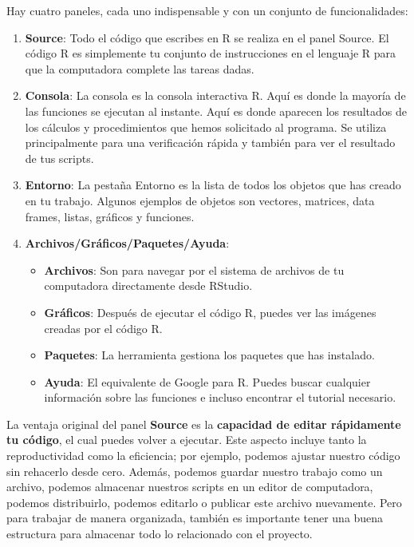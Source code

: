 \documentclass[
  letterpaper,
  DIV=11,
  numbers=noendperiod,
  twoside]{scrreprt}
\providecommand{\tightlist}{%
  \setlength{\itemsep}{0pt}\setlength{\parskip}{0pt}}\usepackage{longtable,booktabs,array}
\begin{document}
Hay cuatro paneles, cada uno indispensable y con un conjunto de
funcionalidades:

\begin{enumerate}
\def\labelenumi{\arabic{enumi}.}
\item
  \textbf{Source}: Todo el código que escribes en R se realiza en el
  panel Source. El código R es simplemente tu conjunto de instrucciones
  en el lenguaje R para que la computadora complete las tareas dadas.
\item
  \textbf{Consola}: La consola es la consola interactiva R. Aquí es
  donde la mayoría de las funciones se ejecutan al instante. Aquí es
  donde aparecen los resultados de los cálculos y procedimientos que
  hemos solicitado al programa. Se utiliza principalmente para una
  verificación rápida y también para ver el resultado de tus scripts.
\item
  \textbf{Entorno}: La pestaña Entorno es la lista de todos los objetos
  que has creado en tu trabajo. Algunos ejemplos de objetos son
  vectores, matrices, data frames, listas, gráficos y funciones.
\item
  \textbf{Archivos/Gráficos/Paquetes/Ayuda}:

  \begin{itemize}
  \tightlist
  \item
    \textbf{Archivos}: Son para navegar por el sistema de archivos de tu
    computadora directamente desde RStudio.
  \item
    \textbf{Gráficos}: Después de ejecutar el código R, puedes ver las
    imágenes creadas por el código R.
  \item
    \textbf{Paquetes}: La herramienta gestiona los paquetes que has
    instalado.
  \item
    \textbf{Ayuda}: El equivalente de Google para R. Puedes buscar
    cualquier información sobre las funciones e incluso encontrar el
    tutorial necesario.
  \end{itemize}
\end{enumerate}

La ventaja original del panel \textbf{Source} es la \textbf{capacidad de
editar rápidamente tu código}, el cual puedes volver a ejecutar. Este
aspecto incluye tanto la reproductividad como la eficiencia; por
ejemplo, podemos ajustar nuestro código sin rehacerlo desde cero.
Además, podemos guardar nuestro trabajo como un archivo, podemos
almacenar nuestros scripts en un editor de computadora, podemos
distribuirlo, podemos editarlo o publicar este archivo nuevamente. Pero
para trabajar de manera organizada, también es importante tener una
buena estructura para almacenar todo lo relacionado con el proyecto.
\end{document}
